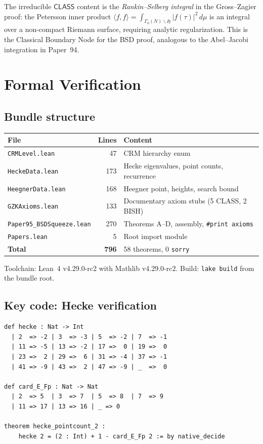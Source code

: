 \documentclass[11pt]{article}
\theoremstyle{plain}
\theoremstyle{definition}
\theoremstyle{remark}
\newcommand{\CLASS}{\ensuremath{\mathsf{CLASS}}}
\begin{document}
The irreducible $\CLASS$ content is the \emph{Rankin--Selberg integral} in the Gross--Zagier proof: the Petersson inner product $\langle f, f \rangle = \int_{\Gamma_0(N) \backslash \mathfrak{H}} |f(\tau)|^2 \, d\mu$ is an integral over a non-compact Riemann surface, requiring analytic regularization. This is the Classical Boundary Node for the BSD proof, analogous to the Abel--Jacobi integration in Paper~94.


\section{Formal Verification}
\label{sec:lean}

\subsection{Bundle structure}

\begin{center}
\begin{tabular}{lrl}
\toprule
\textbf{File} & \textbf{Lines} & \textbf{Content} \\
\midrule
\texttt{CRMLevel.lean} & 47 & CRM hierarchy enum \\
\texttt{HeckeData.lean} & 173 & Hecke eigenvalues, point counts, recurrence \\
\texttt{HeegnerData.lean} & 168 & Heegner point, heights, search bound \\
\texttt{GZKAxioms.lean} & 133 & Documentary axiom stubs (5 CLASS, 2 BISH) \\
\texttt{Paper95\_BSDSqueeze.lean} & 270 & Theorems A--D, assembly, \texttt{\#print axioms} \\
\texttt{Papers.lean} & 5 & Root import module \\
\midrule
\textbf{Total} & \textbf{796} & 58 theorems, 0 \texttt{sorry} \\
\bottomrule
\end{tabular}
\end{center}

Toolchain: Lean~4 v4.29.0-rc2 with Mathlib v4.29.0-rc2. Build: \texttt{lake build} from the bundle root.

\subsection{Key code: Hecke verification}

\begin{lstlisting}[style=leanstyle,caption={Point-count verification (HeckeData.lean).}]
def hecke : Nat -> Int
  | 2  => -2 | 3  => -3 | 5  => -2 | 7  => -1
  | 11 => -5 | 13 => -2 | 17 =>  0 | 19 =>  0
  | 23 =>  2 | 29 =>  6 | 31 => -4 | 37 => -1
  | 41 => -9 | 43 =>  2 | 47 => -9 | _  =>  0

def card_E_Fp : Nat -> Nat
  | 2  => 5  | 3  => 7  | 5  => 8  | 7  => 9
  | 11 => 17 | 13 => 16 | _ => 0

theorem hecke_pointcount_2 :
    hecke 2 = (2 : Int) + 1 - card_E_Fp 2 := by native_decide
\end{lstlisting}
\end{document}
